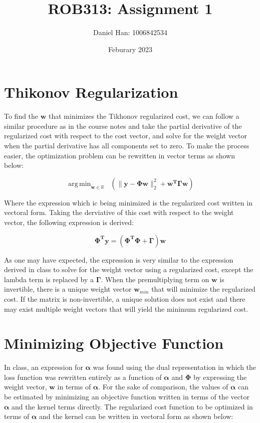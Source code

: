 \documentclass{article}
\title{ROB313: Assignment 1}
\author{Daniel Han: 1006842534}
\date{Feburary 2023}
\DeclareMathOperator*{\argmin}{arg\,min}
\begin{document}
\maketitle


\section{Thikonov Regularization}
To find the $\textbf{w}$ that minimizes the Tikhonov regularized cost, we can follow a similar procedure as in the course notes and take the partial derivative of the regularized cost with respect to the cost vector, and solve for the weight vector when the partial derivative has all components set to zero. To make the process easier, the optimization problem can be rewritten in vector terms as shown below:

\begin{equation}
\argmin_{\textbf{w} \in \mathbb{R}} \;\;  (\| \textbf{y} - \mathbf{\Phi}\mathbf{w} \|_2^2 + \mathbf{w^T}\mathbf{\Gamma}\mathbf{w})
\end{equation}

Where the expression which ic being minimized is the regularized cost written in vectoral form. Taking the derviative of this cost with respect to the weight vector, the following expression is derived:

\begin{equation}
\mathbf{\Phi^T}\mathbf{y} = (\mathbf{\Phi^T \Phi} + \mathbf{\Gamma})\mathbf{w}
\end{equation}

As one may have expected, the expression is very similar to the expression derived in class to solve for the weight vector using a regularized cost, except the lambda term is replaced by a $\mathbf{\Gamma}$. When the premultiplying term on $\mathbf{w}$ is invertible, there is a unique weight vector $\mathbf{w}_{min}$ that will minimize the regularized cost. If the matrix is non-invertible, a unique solution does not exist and there may exist multiple weight vectors that will yield the minimum regularized cost.

\section{Minimizing Objective Function}
In class, an expression for $\boldsymbol\alpha$ was found using the dual representation in which the loss function was rewritten entirely as a function of $\boldsymbol\alpha$ and $\mathbf{\Phi}$ by expressing the weight vector, $\mathbf{w}$ in terms of $\boldsymbol\alpha$. For the sake of comparison, the values of $\boldsymbol\alpha$ can be estimated by minimizing an objective function written in terms of the vector $\boldsymbol\alpha$ and the kernel terms directly. The regularized cost function to be optimized in terms of $\boldsymbol\alpha$ and the kernel can be written in vectoral form as shown below:
\end{document}
